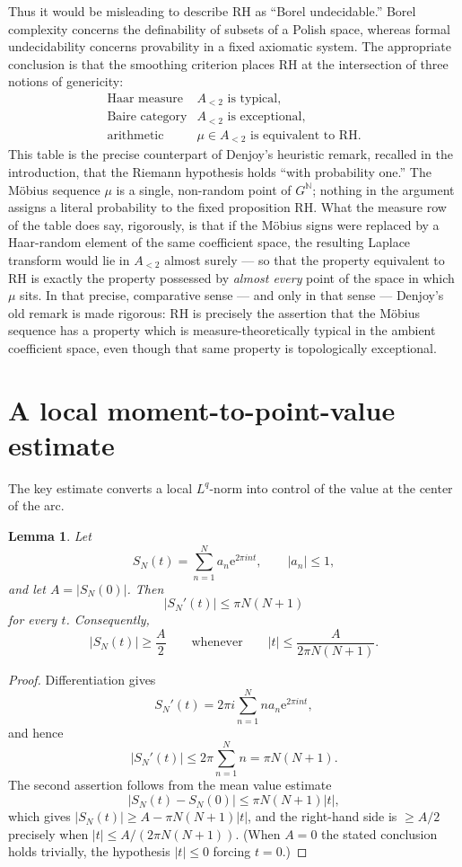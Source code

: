 \documentclass[11pt]{article}
\newtheorem{lemma}[theorem]{Lemma}
\theoremstyle{remark}
\newcommand{\e}{\mathrm e}
\begin{document}
Thus it would be misleading to describe RH as ``Borel undecidable.''
Borel complexity concerns the definability of subsets of a Polish
space, whereas formal undecidability concerns provability in a fixed
axiomatic system.  The appropriate conclusion is that the smoothing
criterion places RH at the intersection of three notions of
genericity:
\[
\begin{array}{c|c}
\text{Haar measure} & A_{<2}\text{ is typical},\\
\text{Baire category} & A_{<2}\text{ is exceptional},\\
\text{arithmetic} & \mu\in A_{<2}\text{ is equivalent to RH}.
\end{array}
\]
This table is the precise counterpart of Denjoy's heuristic remark,
recalled in the introduction, that the Riemann hypothesis holds ``with
probability one.''  The M\"obius sequence \(\mu\) is a single,
non-random point of \(G^{\mathbb N}\); nothing in the argument assigns
a literal probability to the fixed proposition RH.  What the measure
row of the table does say, rigorously, is that if the M\"obius signs
were replaced by a Haar-random element of the same coefficient space,
the resulting Laplace transform would lie in \(A_{<2}\) almost surely
--- so that the property equivalent to RH is exactly the property
possessed by \emph{almost every} point of the space in which \(\mu\)
sits.  In that precise, comparative sense --- and only in that sense
--- Denjoy's old remark is made rigorous: RH is precisely the assertion that
the M\"obius sequence has a property which is measure-theoretically
typical in the ambient coefficient space, even though that same property
is topologically exceptional.

\section{A local moment-to-point-value estimate}
\label{sec:local-fourier}

The key estimate converts a local \(L^q\)-norm into control of the value at the center of the arc.

\begin{lemma}\label{lem:persistence}
Let
\[
 S_N(t)=\sum_{n=1}^N a_n\e^{2\pi i nt},
 \qquad |a_n|\leq1,
\]
and let \(A=|S_N(0)|\).  Then
\[
 |S_N'(t)|\leq \pi N(N+1)
\]
for every \(t\).  Consequently,
\[
 |S_N(t)|\geq\frac A2
 \qquad\text{whenever}\qquad
 |t|\leq \frac{A}{2\pi N(N+1)}.
\]
\end{lemma}

\begin{proof}
Differentiation gives
\[
 S_N'(t)=2\pi i\sum_{n=1}^N n a_n\e^{2\pi i nt},
\]
and hence
\[
 |S_N'(t)|
 \leq2\pi\sum_{n=1}^N n
 =\pi N(N+1).
\]
The second assertion follows from the mean value estimate
\[
 |S_N(t)-S_N(0)|
 \leq \pi N(N+1)|t|,
\]
which gives \(|S_N(t)|\geq A-\pi N(N+1)|t|\), and the right-hand side
is \(\geq A/2\) precisely when \(|t|\leq A/(2\pi N(N+1))\).  (When
\(A=0\) the stated conclusion holds trivially, the hypothesis
\(|t|\leq0\) forcing \(t=0\).)
\end{proof}
\end{document}
